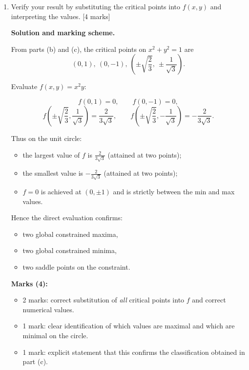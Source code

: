 \documentclass{article}
\begin{document}
\begin{enumerate}[label=(\alph*)]
    \item Verify your result by substituting the critical points into $f(x, y)$ and interpreting the values. [4 marks]

    \begin{mdframed}[linecolor=black, linewidth=1pt]
    \textbf{Solution and marking scheme.}

    From parts (b) and (c), the critical points on $x^2+y^2=1$ are
    \[
    (0,1),\ (0,-1),\ 
    \left(\pm\sqrt{\frac{2}{3}},\ \pm\frac{1}{\sqrt{3}}\right).
    \]
    
    Evaluate $f(x,y)=x^2y$:
    
    \[
    f(0,1) = 0,\qquad f(0,-1) = 0,
    \]
    \[
    f\left(\pm\sqrt{\frac{2}{3}}, \frac{1}{\sqrt{3}}\right) = \frac{2}{3\sqrt{3}},
    \qquad
    f\left(\pm\sqrt{\frac{2}{3}}, -\frac{1}{\sqrt{3}}\right) = -\frac{2}{3\sqrt{3}}.
    \]
    
    Thus on the unit circle:
    \begin{itemize}
      \item the largest value of $f$ is $\displaystyle \frac{2}{3\sqrt{3}}$ (attained at two points);
      \item the smallest value is $\displaystyle -\frac{2}{3\sqrt{3}}$ (attained at two points);
      \item $f=0$ is achieved at $(0,\pm1)$ and is strictly between the min and max values.
    \end{itemize}
    
    Hence the direct evaluation confirms:
    \begin{itemize}
      \item two global constrained maxima,
      \item two global constrained minima,
      \item two saddle points on the constraint.
    \end{itemize}
    
    \textbf{Marks (4):}
    \begin{itemize}
      \item 2 marks: correct substitution of \emph{all} critical points into $f$ and correct numerical values.
      \item 1 mark: clear identification of which values are maximal and which are minimal on the circle.
      \item 1 mark: explicit statement that this confirms the classification obtained in part (c).
    \end{itemize}
    \end{mdframed}

\end{enumerate}
\end{document}
